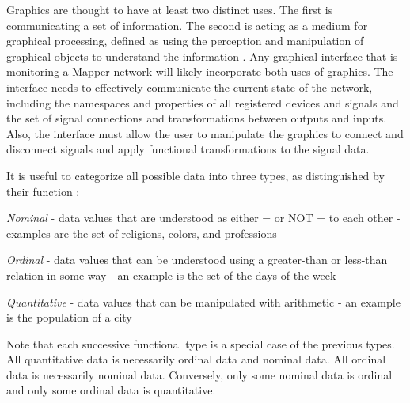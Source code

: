 Graphics are thought to have at least two distinct uses. The first is communicating a set of information. The second is acting as a medium for graphical processing, defined as using the perception and manipulation of graphical objects to understand the information \cite{card1997}. Any graphical interface that is monitoring a Mapper network will likely incorporate both uses of graphics. The interface needs to effectively communicate the current state of the network, including the namespaces and properties of all registered devices and signals and the set of signal connections and transformations between outputs and inputs. Also, the interface must allow the user to manipulate the graphics to connect and disconnect signals and apply functional transformations to the signal data.

It is useful to categorize all possible data into three types, as distinguished by their function \cite{semiology1983}\cite{card1997}:
\begin{description}
\item \emph{Nominal} - data values that are understood as either = or NOT = to each other - examples are the set of religions, colors, and professions
\item \emph{Ordinal} - data values that can be understood using a greater-than or less-than relation in some way - an example is the set of the days of the week
\item \emph{Quantitative} - data values that can be manipulated with arithmetic - an example is the population of a city 
\end{description}

Note that each successive functional type is a special case of the previous types. All quantitative data is necessarily ordinal data and nominal data. All ordinal data is necessarily nominal data. Conversely, only some nominal data is ordinal and only some ordinal data is quantitative.

